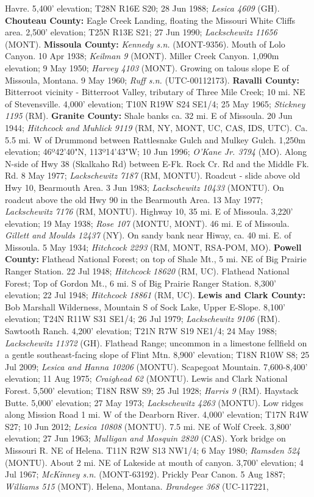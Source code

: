 Havre. 5,400' elevation; T28N R16E S20; 28 Jun 1988; \textit{Lesica 4609} (GH).  \textbf{Chouteau County:}  Eagle Creek Landing, floating the Missouri White Cliffs area. 2,500' elevation; T25N R13E S21; 27 Jun 1990; \textit{Lackschewitz 11656} (MONT).  \textbf{Missoula County:}  \textit{Kennedy s.n.} (MONT-9356).  Mouth of Lolo Canyon. 10 Apr 1938; \textit{Keilman 9} (MONT).  Miller Creek Canyon. 1,090m elevation; 9 May 1950; \textit{Harvey 4103} (MONT).  Growing on talous slope E of Missoula, Montana. 9 May 1960; \textit{Ruff s.n.} (UTC-00112173).  \textbf{Ravalli County:}  Bitterroot vicinity - Bitterroot Valley, tributary of Three Mile Creek; 10 mi. NE of Stevensville. 4,000' elevation; T10N R19W S24 SE1/4; 25 May 1965; \textit{Stickney 1195} (RM).  \textbf{Granite County:}  Shale banks ca. 32 mi. E of Missoula. 20 Jun 1944; \textit{Hitchcock and Muhlick 9119} (RM, NY, MONT, UC, CAS, IDS, UTC).  Ca. 5.5 mi. W of Drummond between Rattlesnake Gulch and Mulkey Gulch. 1,250m elevation; 46º42'40"N, 113º14'43"W; 10 Jun 1996; \textit{O'Kane Jr. 3794} (MO).  Along N-side of Hwy 38 (Skalkaho Rd) between E-Fk. Rock Cr. Rd and the Middle Fk. Rd. 8 May 1977; \textit{Lackschewitz 7187} (RM, MONTU).  Roadcut - slide above old Hwy 10, Bearmouth Area. 3 Jun 1983; \textit{Lackschewitz 10433} (MONTU).  On roadcut above the old Hwy 90 in the Bearmouth Area. 13 May 1977; \textit{Lackschewitz 7176} (RM, MONTU).  Highway 10, 35 mi. E of Missoula. 3,220' elevation; 19 May 1938; \textit{Rose 107} (MONTU, MONT).  46 mi. E of Missoula. \textit{Gillett and Moulds 12437} (NY).  On sandy bank near Hiway, ca. 40 mi. E. of Missoula. 5 May 1934; \textit{Hitchcock 2293} (RM, MONT, RSA-POM, MO).  \textbf{Powell County:}  Flathead National Forest; on top of Shale Mt., 5 mi. NE of Big Prairie Ranger Station. 22 Jul 1948; \textit{Hitchcock 18620} (RM, UC).  Flathead National Forest; Top of Gordon Mt., 6 mi. S of Big Prairie Ranger Station. 8,300' elevation; 22 Jul 1948; \textit{Hitchcock 18861} (RM, UC).  \textbf{Lewis and Clark County:}  Bob Marshall Wilderness, Mountain S of Sock Lake, Upper E-Slope. 8,100' elevation; T24N R11W S31 SE1/4; 26 Jul 1979; \textit{Lackschewitz 9106} (RM).  Sawtooth Ranch. 4,200' elevation; T21N R7W S19 NE1/4; 24 May 1988; \textit{Lackschewitz 11372} (GH).  Flathead Range; uncommon in a limestone fellfield on a gentle southeast-facing slope of Flint Mtn. 8,900' elevation; T18N R10W S8; 25 Jul 2009; \textit{Lesica and Hanna 10206} (MONTU).  Scapegoat Mountain. 7,600-8,400' elevation; 11 Aug 1975; \textit{Craighead 62} (MONTU).  Lewis and Clark National Forest. 5,500' elevation; T18N R8W S9; 25 Jul 1928; \textit{Harris 9} (RM).  Haystack Butte. 5,000' elevation; 27 May 1973; \textit{Lackschewitz 4263} (MONTU).  Low ridges along Mission Road 1 mi. W of the Dearborn River. 4,000' elevation; T17N R4W S27; 10 Jun 2012; \textit{Lesica 10808} (MONTU).  7.5 mi. NE of Wolf Creek. 3,800' elevation; 27 Jun 1963; \textit{Mulligan and Mosquin 2820} (CAS).  York bridge on Missouri R. NE of Helena. T11N R2W S13 NW1/4; 6 May 1980; \textit{Ramsden 524} (MONTU).  About 2 mi. NE of Lakeside at mouth of canyon. 3,700' elevation; 4 Jul 1967; \textit{McKinney s.n.} (MONT-63192).  Prickly Pear Canon. 5 Aug 1887; \textit{Williams 515} (MONT).  Helena, Montana. \textit{Brandegee 368} (UC-117221, 